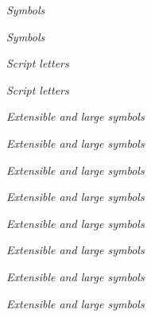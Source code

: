 \documentclass[12pt,a4paper]{article}
\begin{document}
\bigskip
\begin{center}
\textit{Symbols}
\end{center}
\vfill\clearpage

\bigskip
\begin{center}
\textit{Symbols}
\end{center}
\vfill\clearpage

\bigskip
\begin{center}
\textit{Script letters}
\end{center}
\vfill\clearpage


\bigskip
\begin{center}
\textit{Script letters}
\end{center}
\vfill\clearpage

{
\bigskip
\begin{center}
\textit{Extensible and large symbols}
\end{center}
\vfill\clearpage

\bigskip
\begin{center}
\textit{Extensible and large symbols}
\end{center}
\vfill\clearpage

\bigskip
\begin{center}
\textit{Extensible and large symbols}
\end{center}
\vfill\clearpage

\bigskip
\begin{center}
\textit{Extensible and large symbols}
\end{center}
\vfill\clearpage

\bigskip
\begin{center}
\textit{Extensible and large symbols}
\end{center}
\vfill\clearpage

\bigskip
\begin{center}
\textit{Extensible and large symbols}
\end{center}
\vfill\clearpage

\bigskip
\begin{center}
\textit{Extensible and large symbols}
\end{center}
\vfill\clearpage

\bigskip
\begin{center}
\textit{Extensible and large symbols}
\end{center}
\vfill\clearpage

}
\end{document}
